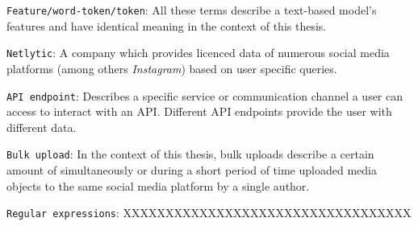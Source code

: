\texttt{Feature/word-token/token}: All these terms describe a text-based model's features and have identical meaning in the context of this thesis.
\newline

\texttt{Netlytic}: A company which provides licenced data of numerous social media platforms (among others \textit{Instagram}) based on user specific queries.
\newline

\texttt{API endpoint}: Describes a specific service or communication channel a user can access to interact with an API. Different API endpoints provide the user with different data.
\newline

\texttt{Bulk upload}: In the context of this thesis, bulk uploads describe a certain amount of simultaneously or during a short period of time uploaded media objects to the same social media platform by a single author.
\newline

\texttt{Regular expressions}: XXXXXXXXXXXXXXXXXXXXXXXXXXXXXXXXXX




 \cleardoublepage

